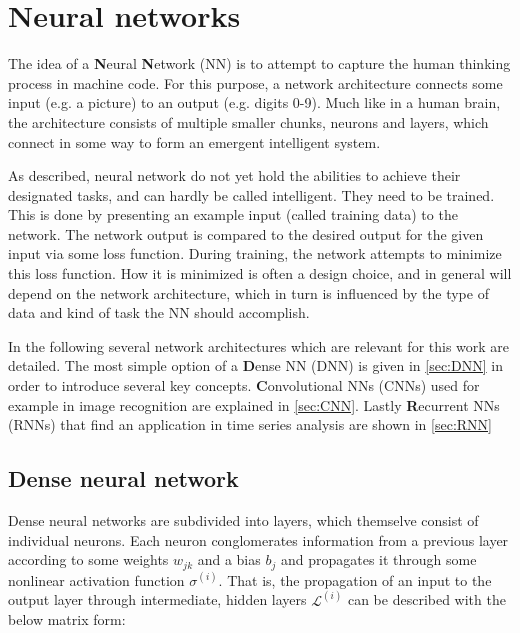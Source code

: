 
\chapter{Neural networks}
\label{chap:neural-networks}

The idea of a \textbf{N}eural \textbf{N}etwork (NN) is to attempt to capture the human thinking process in machine code. For this purpose, a network architecture
connects some input (e.g. a picture) to an output (e.g. digits 0-9). Much like in a human brain, the architecture consists of multiple smaller chunks, neurons 
and layers, which connect in some way to form an emergent intelligent system. 

As described, neural network do not yet hold the abilities to achieve their designated tasks, and can hardly be called intelligent. They need to be trained. 
This is done by presenting an example input (called training data) to the network. The network output is compared to the desired output for the given input via 
some loss function. During training, the network attempts to minimize this loss function. How it is minimized is often a design choice, and in general will 
depend on the network architecture, which in turn is influenced by the type of data and kind of task the NN should accomplish.

In the following several network architectures which are relevant for this work are detailed. The most simple option of a \textbf{D}ense NN (DNN) is given in 
\autoref{sec:DNN} in order to introduce several key concepts. \textbf{C}onvolutional NNs (CNNs) used for example in image recognition are explained in 
\autoref{sec:CNN}. Lastly \textbf{R}ecurrent NNs (RNNs) that find an application in time series analysis are shown in \autoref{sec:RNN}

\section{Dense neural network}
\label{sec:DNN}

Dense neural networks are subdivided into layers, which themselve consist of individual neurons. Each neuron conglomerates information from a previous layer 
according to some weights $w_{jk}$ and a bias $b_j$ and propagates it through some nonlinear activation function $\sigma^{(i)}$. That is, the propagation of 
an input to the output layer through intermediate, hidden layers $\mathcal{L}^{(i)}$ can be described with the below matrix form:

